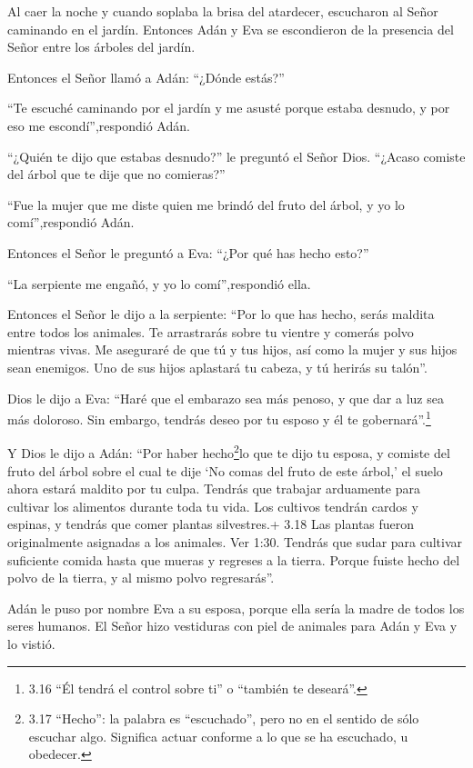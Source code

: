 Al caer la noche y cuando soplaba la brisa del atardecer,
escucharon al Señor caminando en el jardín. Entonces Adán y Eva se
escondieron de la presencia del Señor entre los árboles del jardín.

 Entonces el Señor llamó a Adán: ``¿Dónde estás?''

 ``Te escuché caminando por el jardín y me asusté porque
estaba desnudo, y por eso me escondí'',respondió Adán.

 ``¿Quién te dijo que estabas desnudo?'' le preguntó el
Señor Dios. ``¿Acaso comiste del árbol que te dije que no comieras?''

 ``Fue la mujer que me diste quien me brindó del fruto del
árbol, y yo lo comí'',respondió Adán.

 Entonces el Señor le preguntó a Eva: ``¿Por qué has hecho
esto?''

``La serpiente me engañó, y yo lo comí'',respondió ella.

 Entonces el Señor le dijo a la serpiente: ``Por lo que has
hecho, serás maldita entre todos los animales. Te arrastrarás sobre tu
vientre y comerás polvo mientras vivas.  Me aseguraré de
que tú y tus hijos, así como la mujer y sus hijos sean enemigos. Uno de
sus hijos aplastará tu cabeza, y tú herirás su talón''.

 Dios le dijo a Eva: ``Haré que el embarazo sea más penoso,
y que dar a luz sea más doloroso. Sin embargo, tendrás deseo por tu
esposo y él te gobernará''.\footnote{3.16 ``Él tendrá el control sobre
  ti'' o ``también te deseará''.}

 Y Dios le dijo a Adán: ``Por haber hecho\footnote{3.17
  ``Hecho'': la palabra es ``escuchado'', pero no en el sentido de sólo
  escuchar algo. Significa actuar conforme a lo que se ha escuchado, u
  obedecer.}lo que te dijo tu esposa, y comiste del fruto del árbol
sobre el cual te dije `No comas del fruto de este árbol,' el suelo ahora
estará maldito por tu culpa. Tendrás que trabajar arduamente para
cultivar los alimentos durante toda tu vida.  Los cultivos
tendrán cardos y espinas, y tendrás que comer plantas silvestres.+ 3.18
Las plantas fueron originalmente asignadas a los animales. Ver 1:30.
 Tendrás que sudar para cultivar suficiente comida hasta
que mueras y regreses a la tierra. Porque fuiste hecho del polvo de la
tierra, y al mismo polvo regresarás''.

 Adán le puso por nombre Eva a su esposa, porque ella sería
la madre de todos los seres humanos.  El Señor hizo
vestiduras con piel de animales para Adán y Eva y lo vistió.

